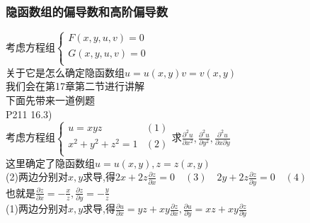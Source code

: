 \documentclass[xetex]{beamer}
\begin{document}
\begin{frame}
	\frametitle{隐函数组的偏导数和高阶偏导数}

	考虑方程组$\begin{cases} 
			F(x,y,u,v)=0\\
			G(x,y,u,v)=0 \\
	\end{cases}
	$\\关于它是怎么确定隐函数组$u=u(x,y)$\quad$v=v(x,y)$\\
	我们会在第17章第二节进行讲解\\
	下面先带来一道例题\\
	P211 16.3)\\
	考虑方程组$\begin{cases} 
	u=xyz & (1)\\
	x^2+y^2+z^2=1 & (2) \\
	\end{cases}$\quad 求$\frac{\partial^2 u}{\partial x^2},\frac{\partial^2 u}{\partial y^2},\frac{\partial^2 u}{\partial x\partial y}$\\
	这里确定了隐函数组$u=u(x,y),z=z(x,y)$\\
	(2)两边分别对$x,y$求导,得$2x+2z\frac{\partial z}{\partial x}=0\quad(3)\quad 2y+2z\frac{\partial z}{\partial y}=0\quad(4)$\\ \pause
	也就是$\frac{\partial z}{\partial x}=-\frac{x}{z},\frac{\partial z}{\partial y}=-\frac{y}{z}$\\ \pause
	(1)两边分别对$x,y$求导,得$\frac{\partial u}{\partial x}=yz+xy\frac{\partial z}{\partial x},\frac{\partial u}{\partial y}=xz+xy\frac{\partial z}{\partial y}$\\ 
	
\end{frame}
\end{document}
